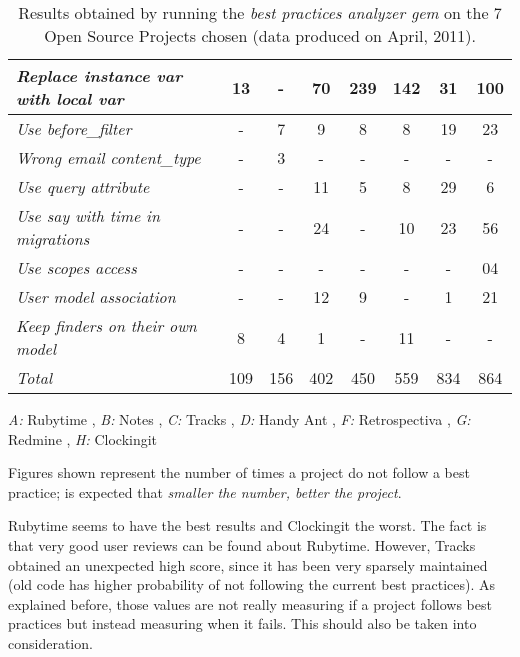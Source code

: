 \begin{table}[H]
\begin{center}
{\begin{threeparttable}
\begin{tabular}{|l||c|c|c|c|c|c|c|}
  \emph{Replace instance var with local var   }              &  13  &   -  &  70  & 239 & 142 &  31 & 100  \\ \hline
  \emph{Use before\_filter                    }              &   -  &   7  &   9  &   8 &   8 &  19 &  23  \\ \hline
  \emph{Wrong email content\_type             }              &   -  &   3  &   -  &   - &   - &   - &   -  \\ \hline
  \emph{Use query attribute                   }              &   -  &   -  &  11  &   5 &   8 &  29 &   6  \\ \hline
  \emph{Use say with time in migrations       }              &   -  &   -  &  24  &   - &  10 &  23 &  56  \\ \hline
  \emph{Use scopes access                     }              &   -  &   -  &   -  &   - &   - &   - &  04  \\ \hline
  \emph{User model association                }              &   -  &   -  &  12  &   9 &   - &   1 &  21  \\ \hline
  \emph{Keep finders on their own model       }              &   8  &   4  &   1  &   - &  11 &   - &   -  \\ \hline
  \emph{Total                                 }              & 109  & 156  & 402  & 450 & 559 & 834 & 864  \\ \hline
  \end{tabular}
  \begin{tablenotes}
    \item \emph{A:} Rubytime
    , \emph{B:} Notes
    , \emph{C:} Tracks
    , \emph{D:} Handy Ant
    , \emph{F:} Retrospectiva
    , \emph{G:} Redmine
    , \emph{H:} Clockingit
    \item Figures shown represent the number of times a project do not follow a best practice; is expected that \emph{smaller the number, better the project}.
  \end{tablenotes}
  \end{threeparttable}
}
\end{center}
\caption{Results obtained by running the \emph{best practices analyzer gem} on the 7 Open Source Projects chosen (data produced on April, 2011).}
\end{table}

Rubytime seems to have the best results and Clockingit the worst. 
The fact is that very good user reviews can be found about Rubytime.
However, Tracks obtained an unexpected high score, since it has been very sparsely maintained 
(old code has higher probability of not following the current best practices).
As explained before, those values are not really measuring if a project follows best practices 
but instead measuring when it fails.
This should also be taken into consideration. 

